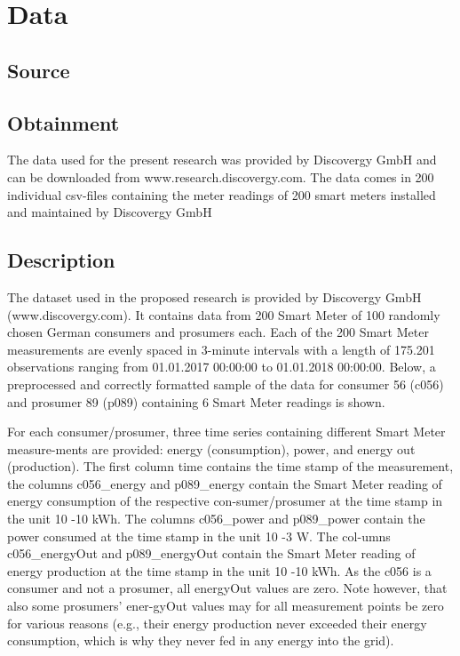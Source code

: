 
\section{Data}\label{Sec:Data}




\subsection{Source}\label{Sec:Data;Subsec:Source}




\subsection{Obtainment}\label{Sec:Data;Subsec:Obtainment}

The data used for the present research was provided by Discovergy GmbH and can be downloaded from www.research.discovergy.com. The data comes in 200 individual csv-files containing the meter readings of 200 smart meters installed and maintained by Discovergy GmbH


\subsection{Description}\label{Sec:Data;Subsec:Description}

The dataset used in the proposed research is provided by Discovergy GmbH (www.discovergy.com). It contains data from 200 Smart Meter of 100 randomly chosen German consumers and prosumers each. Each of the 200 Smart Meter measurements are evenly spaced in 3-minute intervals with a length of 175.201 observations ranging from 01.01.2017 00:00:00 to 01.01.2018 00:00:00.
Below, a preprocessed and correctly formatted sample of the data for consumer 56 (c056) and prosumer 89 (p089) containing 6 Smart Meter readings is shown.

For each consumer/prosumer, three time series containing different Smart Meter measure-ments are provided: energy (consumption), power, and energy out (production). The first column time contains the time stamp of the measurement, the columns c056_energy and p089_energy contain the Smart Meter reading of energy consumption of the respective con-sumer/prosumer at the time stamp in the unit 10 -10 kWh. The columns c056_power and p089_power contain the power consumed at the time stamp in the unit 10 -3 W. The col-umns c056_energyOut and p089_energyOut contain the Smart Meter reading of energy production at the time stamp in the unit 10 -10 kWh. As the c056 is a consumer and not a prosumer, all energyOut values are zero. Note however, that also some prosumers’ ener-gyOut values may for all measurement points be zero for various reasons (e.g., their energy production never exceeded their energy consumption, which is why they never fed in any energy into the grid). 


